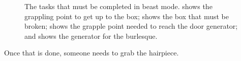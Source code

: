 \documentclass[11pt]{article} %
\begin{document}
	\begin{figure}[b!]
		\centering
		\hfill
		\caption{
			The tasks that must be completed in beast mode.
			 shows the grappling point to get up to the box;
			 shows the box that must be broken;
			 shows the grapple point needed to reach the door generator;
			and  shows the generator for the burlesque.
			}
		\label{fig:fl}
	\end{figure}


	Once that is done, someone needs to grab the hairpiece. \\
\end{document}
